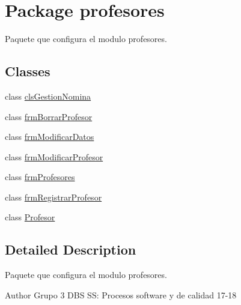 \hypertarget{namespaceprofesores}{}\section{Package profesores}
\label{namespaceprofesores}


Paquete que configura el modulo profesores.  


\subsection*{Classes}
\begin{DoxyCompactItemize}
\item 
class \hyperlink{classprofesores_1_1cls_gestion_nomina}{cls\+Gestion\+Nomina}
\item 
class \hyperlink{classprofesores_1_1frm_borrar_profesor}{frm\+Borrar\+Profesor}
\item 
class \hyperlink{classprofesores_1_1frm_modificar_datos}{frm\+Modificar\+Datos}
\item 
class \hyperlink{classprofesores_1_1frm_modificar_profesor}{frm\+Modificar\+Profesor}
\item 
class \hyperlink{classprofesores_1_1frm_profesores}{frm\+Profesores}
\item 
class \hyperlink{classprofesores_1_1frm_registrar_profesor}{frm\+Registrar\+Profesor}
\item 
class \hyperlink{classprofesores_1_1_profesor}{Profesor}
\end{DoxyCompactItemize}


\subsection{Detailed Description}
Paquete que configura el modulo profesores. 

\begin{DoxyAuthor}{Author}
Grupo 3 D\+BS SS\+: Procesos software y de calidad 17-\/18 
\end{DoxyAuthor}
